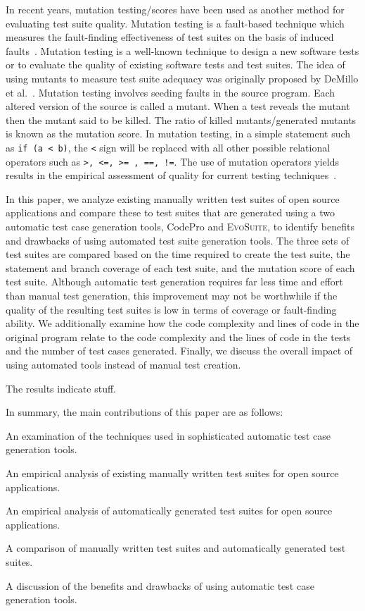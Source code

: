 In recent years, mutation testing/scores have been used as another method for evaluating test suite quality. Mutation
testing is a fault-based technique which measures the fault-finding effectiveness of test suites on the basis of induced
faults~\cite{demillo1978hints, hamlet1977testing}. Mutation testing is a well-known technique to design a new software
tests or to evaluate the quality of existing software tests and test suites. The idea of using mutants to measure test
suite adequacy was originally proposed by DeMillo et al.~\cite{demillo1978hints}. Mutation testing involves seeding
faults in the source program. Each altered version of the source is called a mutant. When a test reveals the mutant then
the mutant said to be killed. The ratio of killed mutants/generated mutants is known as the mutation score. In mutation
testing, in a simple statement such as  \texttt{if (a < b)}, the \texttt{<} sign will be replaced with all other
possible relational operators such as \texttt{>, <=, >= , ==, !=}. The use of mutation operators yields results in the
empirical assessment of quality for current testing techniques~\cite{andrews2005mutation}.  


In this paper, we analyze existing manually written test suites of open source applications and compare these to test
suites that are generated using a two automatic test case generation tools, CodePro and \textsc{EvoSuite}, to identify
benefits and drawbacks of using automated test suite generation tools.  The three sets of test suites are compared based
on the time required to create the test suite, the statement and branch coverage of each test suite, and the mutation
score of each test suite.  Although automatic test generation requires far less time and effort than manual test
generation, this improvement may not be worthwhile if the quality of the resulting test suites is low in terms of
coverage or fault-finding ability.  We additionally examine how the code complexity and lines of code in the original
program relate to the code complexity and the lines of code in the tests and the number of test cases generated.
Finally, we discuss the overall impact of using automated tools instead of manual test creation.

The results indicate stuff.

In summary, the main contributions of this paper are as follows:
\squishlist 
\item An examination of the techniques used in sophisticated automatic test case generation tools.
\item An empirical analysis of existing manually written test suites for open source applications.
\item An empirical analysis of automatically generated test suites for open source applications.
\item A comparison of manually written test suites and automatically generated test suites.
\item A discussion of the benefits and drawbacks of using automatic test case generation tools.
\squishend 

